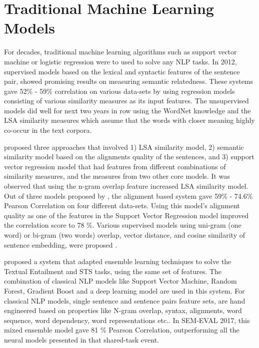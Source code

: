 \documentclass[12pt]{report} %
\begin{document}
\section{Traditional Machine Learning Models}
\label{ml_models_rw}

For decades, traditional machine learning algorithms such as support vector machine or logistic regression were to used to solve any NLP tasks. In 2012, supervised models based on the lexical and syntactic features of the sentence pair, showed promising results on measuring semantic relatedness. These systems gave 52\% - 59\% correlation on various data-sets by using regression models consisting of various similarity measures as its input features. The unsupervised models did well for next two years in row using the WordNet knowledge and the LSA similarity measures which assume that the words with closer meaning highly co-occur in the text corpora. 

\cite{han2013umbc_ebiquity} proposed three approaches that involved 1) LSA similarity model, 2) semantic similarity model based on the alignments quality of the sentences, and 3) support vector regression model that had features from different combinations of similarity measures, and the measures from two other core models. It was observed that using the n-gram overlap feature increased LSA similarity model. Out of three models proposed by \cite{han2013umbc_ebiquity}, the alignment based system gave 59\% - 74.6\% Pearson Correlation on four different data-sets. Using this model's alignment quality as one of the features in the Support Vector Regression model improved the correlation score to 78 \%.  Various supervised models using uni-gram (one word) or bi-gram (two words) overlap, vector distance, and cosine similarity of sentence embedding, were proposed \citep{agirre2015semeval}.   

\cite{tian2017ecnu} proposed a system that adapted ensemble learning techniques to solve the Textual Entailment and STS tasks, using the same set of features. The combination of classical NLP models like Support Vector Machine, Random Forest, Gradient Boost and a deep learning model are used in this system. For classical NLP models, single sentence and sentence pairs feature sets, are hand engineered based on properties like N-gram overlap, syntax, alignments, word sequence, word dependency, word representations etc.. In SEM-EVAL 2017, this mixed ensemble model gave 81 \% Pearson Correlation, outperforming all the neural models presented in that shared-task event.
\end{document}
